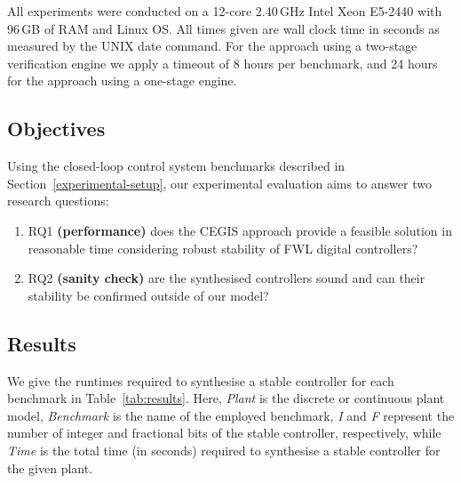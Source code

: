 \documentclass{sig-alternate-05-2015}
\begin{document}
All experiments were conducted on a 12-core 2.40\,GHz Intel Xeon E5-2440
with 96\,GB of RAM and Linux OS.  All times given are wall clock time in
seconds as measured by the UNIX date command.  For the approach using a
two-stage verification engine we apply a timeout of 8 hours per benchmark,
and 24 hours for the approach using a one-stage engine.

\subsection{Objectives}
\label{experimental-objectives}

Using the closed-loop control system benchmarks described in
Section~\ref{experimental-setup}, our experimental evaluation aims to answer
two research questions:
%
\begin{enumerate}

\item RQ1 \textbf{(performance)} does the CEGIS approach provide a feasible
solution in reasonable time considering robust stability of FWL digital
controllers?

\item RQ2 \textbf{(sanity check)} are the synthesised controllers sound
and can their stability be confirmed outside of our model?

\end{enumerate}

\subsection{Results}
\label{experimental-results}

We give the runtimes required to synthesise a stable controller for each
benchmark in Table~\ref{tab:results}.  Here, \textit{Plant} is the discrete
or continuous plant model, \textit{Benchmark} is the name of the employed
benchmark, \textit{I} and \textit{F} represent the number of integer and
fractional bits of the stable controller, respectively, while \textit{Time}
is the total time (in seconds) required to synthesise a stable controller
for the given plant.
\end{document}
